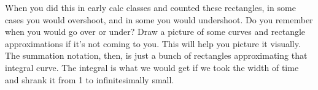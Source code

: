 \begin{appendices}
\begin{subappendices}
    When you did this in early calc classes and counted these rectangles, in some cases you would overshoot, and in some you would undershoot. Do you remember when you would go over or under? Draw a picture of some curves and rectangle approximations if it's not coming to you. This will help you picture it visually. \\
    
    The summation notation, then, is just a bunch of rectangles approximating that integral curve. The integral is what we would get if we took the width of time and shrank it from 1 to infinitesimally small.
    
\end{subappendices}

\end{appendices}